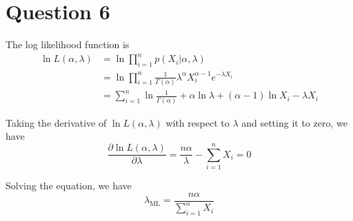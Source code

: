 \documentclass[a4paper,12pt]{article}
\newcommand{\pard}[2]{\frac{\partial #1}{\partial #2}}
\begin{document}
\section*{Question 6}

The log likelihood function is
\begin{align*}
	\ln L(\alpha, \lambda) &= \ln \prod_{i=1}^{n} p(X_i | \alpha, \lambda) \\
	&= \ln \prod_{i=1}^{n} \frac{1}{\Gamma(\alpha)} \lambda^{\alpha} X_i^{\alpha - 1} e^{-\lambda X_i} \\
	&= \sum_{i=1}^{n} \ln \frac{1}{\Gamma(\alpha)} + \alpha \ln \lambda + (\alpha - 1) \ln X_i - \lambda X_i
\end{align*}

Taking the derivative of $\ln L(\alpha, \lambda)$ with respect to $\lambda$ and setting it to zero, we have
\begin{equation*}
	\pard{\ln L(\alpha, \lambda)}{\lambda} = \frac{n\alpha}{\lambda} - \sum_{i=1}^{n} X_i = 0
\end{equation*}

Solving the equation, we have
\begin{equation*}
	\lambda_{\text{ML}} = \frac{n\alpha}{\sum_{i=1}^{n} X_i}
\end{equation*}
\end{document}
